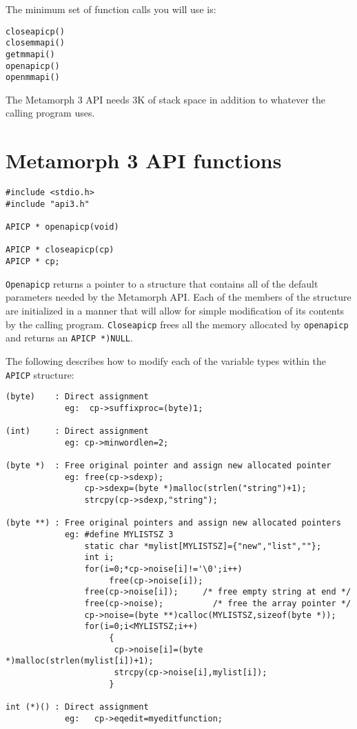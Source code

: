 The minimum set of function calls you will use is:

\begin{verbatim}
closeapicp()
closemmapi()
getmmapi()
openapicp()
openmmapi()
\end{verbatim}

The Metamorph 3 API needs 3K of stack space in addition to
whatever the calling program uses.

\chapter{Metamorph 3 API functions}


\SYNOPSIS
\begin{verbatim}
#include <stdio.h>
#include "api3.h"

APICP * openapicp(void)

APICP * closeapicp(cp)
APICP * cp;

\end{verbatim}

\DESCRIPTION

\verb`Openapicp` returns a pointer to a structure that contains all of
the default parameters needed by the Metamorph API.  Each of the
members of the structure are initialized in a manner that will
allow for simple modification of its contents by the calling
program.  \verb`Closeapicp` frees all the memory allocated by \verb`openapicp`
and returns an \verb`APICP *)NULL`.

The following describes how to modify each of the variable types
within the \verb`APICP` structure:

\begin{verbatim}
(byte)    : Direct assignment
            eg:  cp->suffixproc=(byte)1;

(int)     : Direct assignment
            eg: cp->minwordlen=2;

(byte *)  : Free original pointer and assign new allocated pointer
            eg: free(cp->sdexp);
                cp->sdexp=(byte *)malloc(strlen("string")+1);
                strcpy(cp->sdexp,"string");

(byte **) : Free original pointers and assign new allocated pointers
            eg: #define MYLISTSZ 3
                static char *mylist[MYLISTSZ]={"new","list",""};
                int i;
                for(i=0;*cp->noise[i]!='\0';i++)
                     free(cp->noise[i]);
                free(cp->noise[i]);     /* free empty string at end */
                free(cp->noise);          /* free the array pointer */
                cp->noise=(byte **)calloc(MYLISTSZ,sizeof(byte *));
                for(i=0;i<MYLISTSZ;i++)
                     {
                      cp->noise[i]=(byte *)malloc(strlen(mylist[i])+1);
                      strcpy(cp->noise[i],mylist[i]);
                     }

int (*)() : Direct assignment
            eg:   cp->eqedit=myeditfunction;

\end{verbatim}


